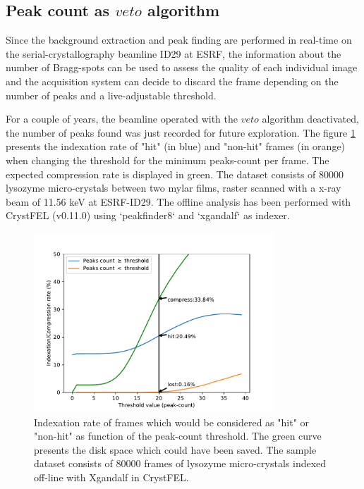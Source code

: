 \documentclass[preprint]{iucr}              %
\begin{document}
\subsection{Peak count as $veto$ algorithm}
Since the background extraction and peak finding are performed in real-time on the serial-crystallography beamline ID29 at ESRF, the information about the number of Bragg-spots can be used to assess the quality of each individual image and the acquisition system can decide to discard the frame depending on the number of peaks and a live-adjustable threshold. 

For a couple of years, the beamline operated with the $veto$ algorithm deactivated, the number of peaks found was just recorded for future exploration. 
The figure \ref{veto-fig} presents the indexation rate of "hit" (in blue) and "non-hit" frames (in orange) when changing the threshold for the minimum peaks-count per frame. 
The expected compression rate is displayed in green.
The dataset consists of 80000 lysozyme micro-crystals between two mylar films, raster scanned with a x-ray beam of 11.56 keV at ESRF-ID29.
The offline analysis has been performed with CrystFEL (v0.11.0) using `peakfinder8` and `xgandalf` as indexer. 

\begin{figure}
\label{veto-fig}
\begin{center}
\includegraphics[width=9cm]{fig7/veto-fig}
\caption{Indexation rate of frames which would be considered as "hit" or "non-hit" as function of the peak-count threshold. 
The green curve presents the disk space which could have been saved.
The sample dataset consists of 80000 frames of lysozyme micro-crystals indexed off-line with Xgandalf in CrystFEL.}
\end{center}
\end{figure}

\end{document}
